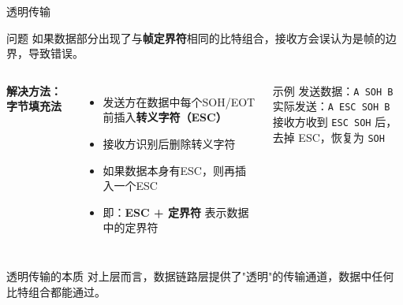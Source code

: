 \documentclass[10pt, aspectratio=169]{beamer}
\begin{document}
\begin{frame}{透明传输}
    \begin{block}{问题}
        如果数据部分出现了与\textbf{帧定界符}相同的比特组合，接收方会误认为是帧的边界，导致错误。
    \end{block}
    \vspace{0.3em}
    \begin{columns}[T]
        \textbf{解决方法：字节填充法}
        \begin{itemize}
            \item 发送方在数据中每个SOH/EOT前插入\textbf{转义字符（ESC）}
            \item 接收方识别后删除转义字符
            \item 如果数据本身有ESC，则再插入一个ESC
            \item 即：\textbf{ESC + 定界符} 表示数据中的定界符
        \end{itemize}
        \begin{exampleblock}{示例}
            发送数据：\texttt{A SOH B}\\
            实际发送：\texttt{A ESC SOH B}\\
            接收方收到 \texttt{ESC SOH} 后，去掉 ESC，恢复为 \texttt{SOH}
        \end{exampleblock}
    \end{columns}
    \vspace{0.3em}
    \begin{alertblock}{透明传输的本质}
        对上层而言，数据链路层提供了"透明"的传输通道，数据中任何比特组合都能通过。
    \end{alertblock}
\end{frame}
\end{document}
